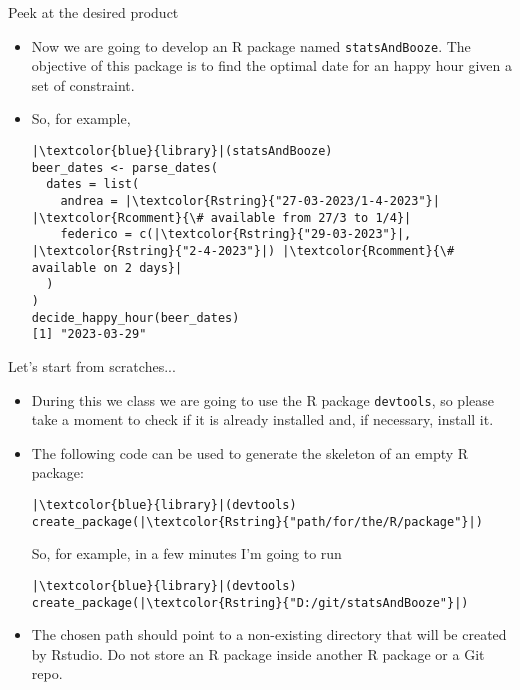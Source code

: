 \documentclass[
hyperref={bookmarks=false},
xcolor={dvipsnames,svgnames*,x11names*}, 
12pt
]{beamer}
\begin{document}
\begin{frame}[fragile]{Peek at the desired product}
\vspace{-0.5cm}
\begin{itemize}
\itemsep 2ex
\item Now we are going to develop an R package named \texttt{statsAndBooze}. The objective of this package is to find the optimal date for an happy hour given a set of constraint. 
\item So, for example, 
\begin{lstlisting}
|\textcolor{blue}{library}|(statsAndBooze)
beer_dates <- parse_dates(
  dates = list(
    andrea = |\textcolor{Rstring}{"27-03-2023/1-4-2023"}| |\textcolor{Rcomment}{\# available from 27/3 to 1/4}|
    federico = c(|\textcolor{Rstring}{"29-03-2023"}|, |\textcolor{Rstring}{"2-4-2023"}|) |\textcolor{Rcomment}{\# available on 2 days}|
  )
)
decide_happy_hour(beer_dates)
[1] "2023-03-29"
\end{lstlisting}
\end{itemize}
\end{frame}

\begin{frame}[fragile]{Let's start from scratches...}
\vspace{-0.5cm}
\begin{itemize}
\itemsep 2ex
\item During this we class we are going to use the R package \texttt{devtools}, so please take a moment to check if it is already installed and, if necessary, install it. 
\item The following code can be used to generate the skeleton of an empty R package:
\begin{lstlisting}
|\textcolor{blue}{library}|(devtools)
create_package(|\textcolor{Rstring}{"path/for/the/R/package"}|)
\end{lstlisting}
So, for example, in a few minutes I'm going to run
\begin{lstlisting}
|\textcolor{blue}{library}|(devtools)
create_package(|\textcolor{Rstring}{"D:/git/statsAndBooze"}|)
\end{lstlisting}
\item The chosen path should point to a non-existing directory that will be created by Rstudio. Do not store an R package inside another R package or a Git repo. 
\end{itemize}
\end{frame}
\end{document}

